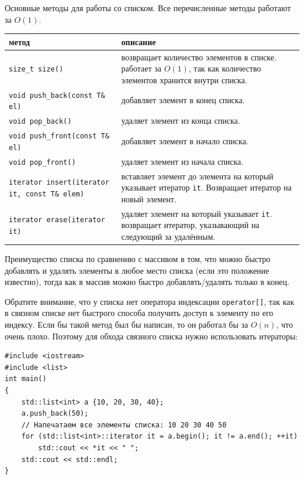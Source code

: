 \documentclass{article}
\begin{document}
 Основные методы для работы со списком. Все перечисленные методы работают за $O(1)$.

\bgroup
\def\arraystretch{2}%
\begin{tabular}{ l | p{8cm} }
метод & описание \\ \hline
\texttt{size\_t size()} & возвращает количество элементов в списке. \newline
                          работает за $O(1)$, так как количество элементов хранится внутри списка.
\\ \hline

\texttt{void push\_back(const T\& el)} & добавляет элемент в конец списка.
\\ \hline
\texttt{void pop\_back()} & удаляет элемент из конца списка.
\\ \hline
\texttt{void push\_front(const T\& el)} & добавляет элемент в начало списка.
\\ \hline
\texttt{void pop\_front()} & удаляет элемент из начала списка.
\\ \hline

\texttt{iterator insert(iterator it, const T\& elem)} & вставляет элемент до элемента на который указывает итератор \texttt{it}. Возвращает итератор на новый элемент.
\\ \hline

\texttt{iterator erase(iterator it)} & удаляет элемент на который указывает \texttt{it}. \newline
                                       возвращает итератор, указывающий на следующий за удалённым. \newline
\\
\end{tabular}
\egroup

Преимущество списка по сравнению с массивом в том, что можно быстро добавлять и удалять элементы в любое место списка (если это положение известно), тогда как в массив можно быстро добавлять/удалять только в конец.

Обратите внимание, что у списка нет оператора индексации \texttt{operator[]},
так как в связном списке нет быстрого способа получить доступ к элементу по его индексу.
Если бы такой метод был бы написан, то он работал бы за $O(n)$, что очень плохо.
Поэтому для обхода связного списка нужно использовать итераторы:

\begin{lstlisting}
#include <iostream>
#include <list>
int main()
{
    std::list<int> a {10, 20, 30, 40};
    a.push_back(50);
    // Напечатаем все элементы списка: 10 20 30 40 50
    for (std::list<int>::iterator it = a.begin(); it != a.end(); ++it)
        std::cout << *it << " ";
    std::cout << std::endl;    
}
\end{lstlisting}
\end{document}
